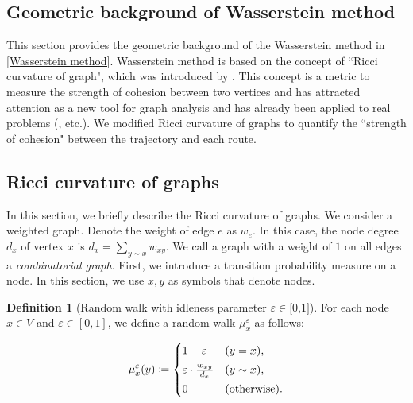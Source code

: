 \documentclass{article}
\numberwithin{equation}{section}
\theoremstyle{definition}
\newtheorem{definition}{Definition}[section]
\newcommand{\dis}{\displaystyle}
\newcommand{\eps}{\varepsilon} %
\newcommand{\rwx}{\mu_x^\eps} %
\def\:={\coloneqq} %
\begin{document}
\begin{appendices}

\setcounter{figure}{0}
\setcounter{table}{0}


\section{Geometric background of Wasserstein method} \label{appendix}

This section provides the geometric background of the Wasserstein method in \autoref{Wasserstein method}.
Wasserstein method is based on the concept of ``Ricci curvature of graph", which was introduced by \cite{Ol,LLY}.
This concept is a metric to measure the strength of cohesion between two vertices and has attracted attention as a new tool for graph analysis and has already been applied to real problems (\cite{JL,NLGGS,NLLG}, etc.).
We modified Ricci curvature of graphs to quantify the ``strength of cohesion" between the trajectory and each route.

\subsection{Ricci curvature of graphs} \label{subappendix:graph}

In this section, we briefly describe the Ricci curvature of graphs.
We consider a weighted graph.
Denote the weight of edge $e$ as $w_e$.
In this case, the node degree $d_x$ of vertex $x$ is $d_x=\sum_{y\sim x}w_{xy}$.
We call a graph with a weight of $1$ on all edges a \emph{combinatorial graph}.
First, we introduce a transition probability measure on a node.
In this section, we use $x,y$ as symbols that denote nodes.

\begin{definition}[Random walk with idleness parameter $\eps\in\text{[0,1]}$] \label{random walk}
For each node $x\in V$ and $\eps\in[0,1]$, we define a random walk $\rwx$ as follows: \vspace{-6mm}
\begin{center}
\[ \dis \rwx(y) \:=
\begin{cases}
1-\eps & (y=x) , \vspace{1mm} \\
\eps\cdot\frac{w_{xy}}{d_x} & (y\sim x) , \vspace{1mm} \\
0 & (\text{otherwise}) .
\end{cases}\]
\end{center} 
\end{definition}


\end{appendices}
\end{document}
